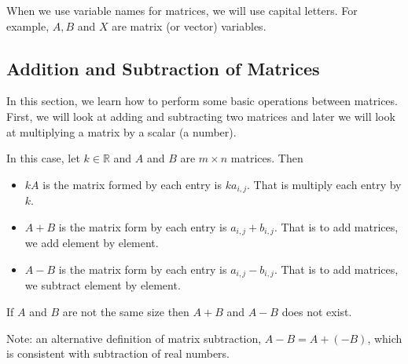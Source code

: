 When we use variable names for matrices, we will use capital letters.  For example, $A, B$ and $X$ are matrix (or vector) variables.

\subsection{Addition and Subtraction of Matrices}


In this section, we learn how to perform some basic operations between matrices.  First, we will look at adding and subtracting two matrices and later we will look at multiplying a matrix by a scalar (a number).

\begin{definition}
In this case, let $k \in \mathbb{R}$ and $A$ and $B$ are $m \times n$ matrices.  Then

\begin{itemize}
\item $kA$ is the matrix formed by each entry is $ka_{i,j}$.  That is multiply each entry by $k$.
\item $A+B$ is the matrix form by each entry is $a_{i,j}+b_{i,j}$.  That is to add matrices, we add element by element.
\item $A-B$ is the matrix form by each entry is $a_{i,j}-b_{i,j}$.  That is to add matrices, we subtract element by element.
\end{itemize}
If $A$ and $B$ are not the same size then $A+B$ and $A-B$ does not exist.
\end{definition}

Note: an alternative definition of matrix subtraction, $A-B=A+(-B)$, which is consistent with subtraction of real numbers.

